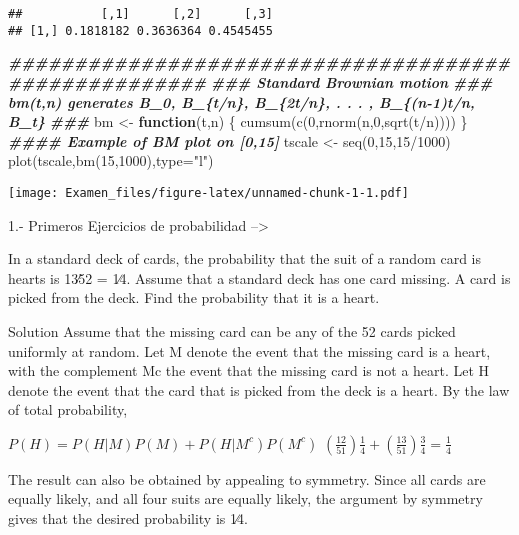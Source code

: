\documentclass[
]{article}
\newenvironment{Shaded}{\begin{snugshade}}{\end{snugshade}}
\newcommand{\AttributeTok}[1]{\textcolor[rgb]{0.77,0.63,0.00}{#1}}
\newcommand{\ControlFlowTok}[1]{\textcolor[rgb]{0.13,0.29,0.53}{\textbf{#1}}}
\newcommand{\DecValTok}[1]{\textcolor[rgb]{0.00,0.00,0.81}{#1}}
\newcommand{\DocumentationTok}[1]{\textcolor[rgb]{0.56,0.35,0.01}{\textbf{\textit{#1}}}}
\newcommand{\FunctionTok}[1]{\textcolor[rgb]{0.00,0.00,0.00}{#1}}
\newcommand{\NormalTok}[1]{#1}
\newcommand{\OtherTok}[1]{\textcolor[rgb]{0.56,0.35,0.01}{#1}}
\newcommand{\SpecialCharTok}[1]{\textcolor[rgb]{0.00,0.00,0.00}{#1}}
\newcommand{\StringTok}[1]{\textcolor[rgb]{0.31,0.60,0.02}{#1}}
\begin{document}
\begin{verbatim}
##           [,1]      [,2]      [,3]
## [1,] 0.1818182 0.3636364 0.4545455
\end{verbatim}

\begin{Shaded}
\begin{Highlighting}[]
\DocumentationTok{\#\#\#\#\#\#\#\#\#\#\#\#\#\#\#\#\#\#\#\#\#\#\#\#\#\#\#\#\#\#\#\#\#\#\#\#\#\#\#\#\#\#\#\#\#\#\#\#\#\#\#\#\#}
\DocumentationTok{\#\#\# Standard Brownian motion}
\DocumentationTok{\#\#\# bm(t,n) generates B\_0, B\_\{t/n\}, B\_\{2t/n\}, . . . , B\_\{(n{-}1)t/n, B\_t\}}
\DocumentationTok{\#\#\#}
\NormalTok{bm }\OtherTok{\textless{}{-}} \ControlFlowTok{function}\NormalTok{(t,n) \{}
    \FunctionTok{cumsum}\NormalTok{(}\FunctionTok{c}\NormalTok{(}\DecValTok{0}\NormalTok{,}\FunctionTok{rnorm}\NormalTok{(n,}\DecValTok{0}\NormalTok{,}\FunctionTok{sqrt}\NormalTok{(t}\SpecialCharTok{/}\NormalTok{n))))}
\NormalTok{\}}
\DocumentationTok{\#\#\#\# Example of BM plot on [0,15]}
\NormalTok{tscale }\OtherTok{\textless{}{-}} \FunctionTok{seq}\NormalTok{(}\DecValTok{0}\NormalTok{,}\DecValTok{15}\NormalTok{,}\DecValTok{15}\SpecialCharTok{/}\DecValTok{1000}\NormalTok{)}
\FunctionTok{plot}\NormalTok{(tscale,}\FunctionTok{bm}\NormalTok{(}\DecValTok{15}\NormalTok{,}\DecValTok{1000}\NormalTok{),}\AttributeTok{type=}\StringTok{"l"}\NormalTok{)}
\end{Highlighting}
\end{Shaded}

\texttt{[image: Examen\_files/figure-latex/unnamed-chunk-1-1.pdf]}

1.- Primeros Ejercicios de probabilidad --\textgreater{}

In a standard deck of cards, the probability that the suit of a random
card is hearts is 13∕52 = 1∕4. Assume that a standard deck has one card
missing. A card is picked from the deck. Find the probability that it is
a heart.

Solution Assume that the missing card can be any of the 52 cards picked
uniformly at random. Let M denote the event that the missing card is a
heart, with the complement Mc the event that the missing card is not a
heart. Let H denote the event that the card that is picked from the deck
is a heart. By the law of total probability,

\(P(H) = P(H|M)P(M) + P(H|M^c)P(M^c)\)
\((\frac{12}{51}) \frac{1}{4} + (\frac{13}{51})\frac{3}{4} = \frac{1}{4}\)

The result can also be obtained by appealing to symmetry. Since all
cards are equally likely, and all four suits are equally likely, the
argument by symmetry gives that the desired probability is 1∕4.
\end{document}
